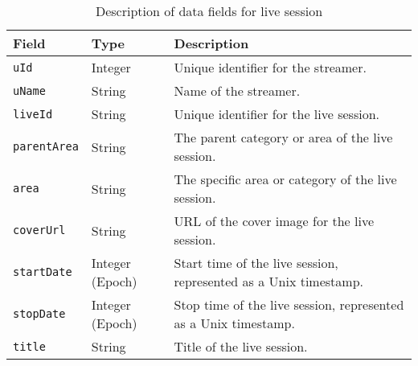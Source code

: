 \begin{table}[h!]
\centering \small
\begin{tabular}{|l|l|L{14em}|}
\hline
\textbf{Field}           & \textbf{Type}    & \textbf{Description}                                                             \\ \hline
\texttt{uId}             & Integer          & Unique identifier for the streamer.                                                   \\ \hline
\texttt{uName}           & String           & Name of the streamer.                                \\ \hline
\texttt{liveId}          & String           & Unique identifier for the live session.                                           \\ \hline
\texttt{parentArea}      & String           & The parent category or area of the live session.                                  \\ \hline
\texttt{area}            & String           & The specific area or category of the live session.                                \\ \hline
\texttt{coverUrl}        & String           & URL of the cover image for the live session.                                      \\ \hline
\texttt{startDate}       & Integer (Epoch)  & Start time of the live session, represented as a Unix timestamp.                  \\ \hline
\texttt{stopDate}        & Integer (Epoch)  & Stop time of the live session, represented as a Unix timestamp.                   \\ \hline
\texttt{title}           & String           & Title of the live session.                                                        \\ \hline
\end{tabular}
\caption{Description of data fields for live session}
\label{table:data_description}
\end{table}


